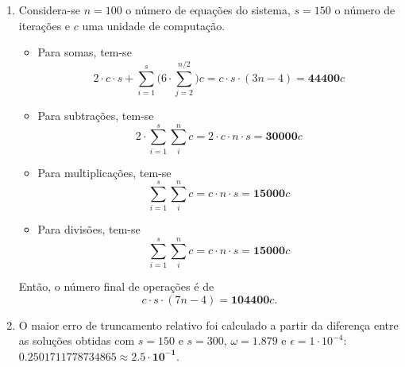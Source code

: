 \documentclass{article}
\newenvironment{arabenum}{
    \begin{enumerate}[label=\textbf{\arabic*})]
}{
    \end{enumerate}
}
\newenvironment{alphenum}{
    \begin{enumerate}[label=(\alph*)]
}{
    \end{enumerate}
}
\begin{document}
\begin{arabenum}
\begin{alphenum}
\item Considera-se $n = 100$ o número de equações do sistema, $s = 150$ o
número de iterações e $c$ uma unidade de computação.

\begin{itemize}

\item Para somas, tem-se
\begin{equation*}
2 \cdot c \cdot s + \sum_{i=1}^s \Big( 6 \cdot \sum_{j=2}^{n/2} \Big) c
= c \cdot s \cdot (3n - 4) = \boldsymbol{44400}c
\end{equation*}

\item Para subtrações, tem-se
\begin{equation*}
2 \cdot \sum_{i=1}^s \sum_{i}^n c = 2 \cdot c \cdot n \cdot s
= \boldsymbol{30000}c
\end{equation*}

\item Para multiplicações, tem-se
\begin{equation*}
\sum_{i=1}^s \sum_{i}^n c = c \cdot n \cdot s = \boldsymbol{15000}c
\end{equation*}

\item Para divisões, tem-se
\begin{equation*}
\sum_{i=1}^s \sum_{i}^n c = c \cdot n \cdot s = \boldsymbol{15000}c
\end{equation*}

\end{itemize}

Então, o número final de operações é de
\begin{equation*}
c \cdot s \cdot (7n - 4) = \boldsymbol{104400}c.
\end{equation*}

\item O maior erro de truncamento relativo foi calculado a partir da diferença
entre as soluções obtidas com $s = 150$ e $s = 300$, $\omega = 1.879$
e $\epsilon = 1 \cdot 10^{-4}$: $0.2501711778734865 \approx
\boldsymbol{2.5 \cdot 10^{-1}}$.

\end{alphenum}

\end{arabenum}
\end{document}
